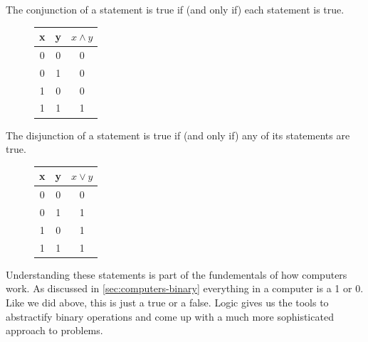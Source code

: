 \documentclass[12pt,a4paper]{book}
\begin{document}
			The conjunction of a statement is true if (and only if) each statement is true.
			\begin{figure}
				\centering
				\begin{minipage}{0.7\linewidth}
					\begin{table}[H]
						\centering
						\begin{tabular}{c|c|c}
							x & y & $x\land y$ \\
							\hline
							0 & 0 & 0 \\
							0 & 1 & 0 \\
							1 & 0 & 0 \\
							1 & 1 & 1
						\end{tabular}
					\end{table}
				\end{minipage}
				\begin{minipage}{0.29\linewidth}
					\centering
				\end{minipage}
			\end{figure}
			The disjunction of a statement is true if (and only if) any of its statements are true.
			\begin{figure}
				\centering
				\begin{minipage}{0.7\linewidth}
					\begin{table}[H]
						\centering
						\begin{tabular}{c|c|c}
							x & y & $x\lor y$ \\
							\hline
							0 & 0 & 0 \\
							0 & 1 & 1 \\
							1 & 0 & 1 \\
							1 & 1 & 1
						\end{tabular}
					\end{table}
				\end{minipage}
				\begin{minipage}{0.29\linewidth}
					\centering
				\end{minipage}
			\end{figure}

			Understanding these statements is part of the fundementals of how computers work. As discussed in \ref{sec:computers-binary} everything in a computer is a 1 or 0. Like we did above, this is just a true or a false. Logic gives us the tools to abstractify binary operations and come up with a much more sophisticated approach to problems.
\end{document}
